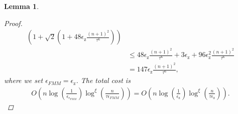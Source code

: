 \documentclass{article}
\newcommand{\lpar}{\left(}
\newcommand{\rpar}{\right)}
\newtheorem{lemma}{Lemma}[section]
\newcommand\vecz{\boldsymbol{\mathrm{z}}}
\newcommand{\cfmm}{\xi}
\begin{document}
\begin{lemma}
\begin{proof}
\begin{align*}
            \lpar
                1
                +
                \sqrt{2}
                (1+48\epsilon_{\vecz}
                \tfrac{(n+1)^2}{\tau^6})
            \rpar
            \\
            &\leq
            48\epsilon_{\vecz}
                \tfrac{(n+1)^2}{\tau^6}
            +
            3\epsilon_{\vecz}
            +
            96\epsilon_{\vecz}^2
                \tfrac{(n+1)^2}{\tau^6}
            \\
            &=
            147\epsilon_{\vecz}
                \tfrac{(n+1)^2}{\tau^6},
        \end{align*}
        where we set $\epsilon_{FMM}=\epsilon_{\vecz}$. The total cost is
        \begin{align*}
            O\lpar
                n\log(\tfrac{1}{\epsilon_{\epsilon_{FMM}}})
                \log^{\cfmm}(\tfrac{n}{\tau\epsilon_{FMM}})
            \rpar
            =
            O\lpar
                n\log(\tfrac{1}{\epsilon_{\vecz}})
                \log^{\cfmm}(\tfrac{n}{\tau\epsilon_{\vecz}})
            \rpar.
        \end{align*}
    \end{proof}
\end{lemma}
\end{document}
